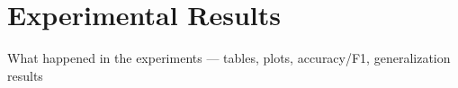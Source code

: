 \chapter{Experimental Results}
What happened in the experiments — tables, plots, accuracy/F1, generalization results
\label{chap:results}
